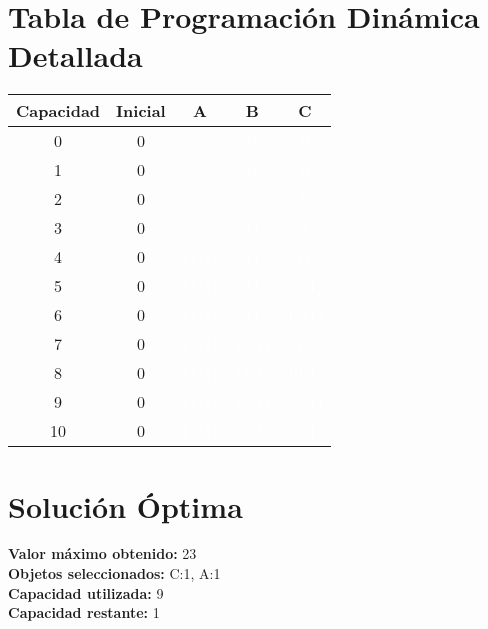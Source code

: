 \documentclass{article}
\begin{document}
\section*{Tabla de Programación Dinámica Detallada}
\begin{center}
\scriptsize
\begin{tabular}{|c|c|c|c|c|}
\hline
Capacidad & Inicial & A & B & C \\ \hline
0 & 0 & \cellcolor{rojo}\textcolor{white}{0} & \cellcolor{rojo}\textcolor{white}{0} & \cellcolor{rojo}\textcolor{white}{0} \\ \hline
1 & 0 & \cellcolor{rojo}\textcolor{white}{0} & \cellcolor{rojo}\textcolor{white}{0} & \cellcolor{rojo}\textcolor{white}{0} \\ \hline
2 & 0 & \cellcolor{rojo}\textcolor{white}{0} & \cellcolor{rojo}\textcolor{white}{0} & \cellcolor{rojo}\textcolor{white}{0} \\ \hline
3 & 0 & \cellcolor{rojo}\textcolor{white}{0} & \cellcolor{verde}\textcolor{white}{7(1)} & \cellcolor{rojo}\textcolor{white}{7} \\ \hline
4 & 0 & \cellcolor{verde}\textcolor{white}{11(1)} & \cellcolor{rojo}\textcolor{white}{11} & \cellcolor{rojo}\textcolor{white}{11} \\ \hline
5 & 0 & \cellcolor{verde}\textcolor{white}{11(1)} & \cellcolor{rojo}\textcolor{white}{11} & \cellcolor{verde}\textcolor{white}{12(1)} \\ \hline
6 & 0 & \cellcolor{verde}\textcolor{white}{11(1)} & \cellcolor{rojo}\textcolor{white}{11} & \cellcolor{verde}\textcolor{white}{12(1)} \\ \hline
7 & 0 & \cellcolor{verde}\textcolor{white}{11(1)} & \cellcolor{verde}\textcolor{white}{18(1)} & \cellcolor{rojo}\textcolor{white}{18} \\ \hline
8 & 0 & \cellcolor{verde}\textcolor{white}{11(1)} & \cellcolor{verde}\textcolor{white}{18(1)} & \cellcolor{verde}\textcolor{white}{19(1)} \\ \hline
9 & 0 & \cellcolor{verde}\textcolor{white}{11(1)} & \cellcolor{verde}\textcolor{white}{18(1)} & \cellcolor{verde}\textcolor{white}{23(1)} \\ \hline
10 & 0 & \cellcolor{verde}\textcolor{white}{11(1)} & \cellcolor{verde}\textcolor{white}{18(1)} & \cellcolor{verde}\textcolor{white}{23(1)} \\ \hline
\end{tabular}
\end{center}
\normalsize

\section*{Solución Óptima}
\textbf{Valor máximo obtenido:} 23\\
\textbf{Objetos seleccionados:} C:1, A:1\\
\textbf{Capacidad utilizada:} 9\\
\textbf{Capacidad restante:} 1\\
\end{document}
